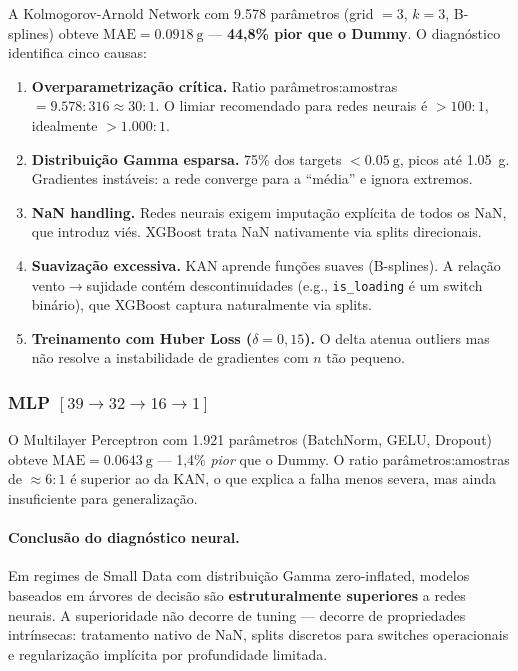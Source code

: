 \documentclass[12pt, a4paper]{article}
\newcommand{\feature}[1]{\texttt{#1}}
\newcommand{\mae}{\text{MAE}}
\begin{document}
A Kolmogorov-Arnold Network com 9.578 parâmetros (grid $= 3$, $k = 3$,
B-splines) obteve $\mae = \SI{0,0918}{\gram}$ --- \textbf{44,8\% pior
que o Dummy}. O diagnóstico identifica cinco causas:

\begin{enumerate}
    \item \textbf{Overparametrização crítica.} Ratio
          parâmetros:amostras $= 9.578:316 \approx 30{:}1$.
          O limiar recomendado para redes neurais é $> 100{:}1$,
          idealmente $> 1.000{:}1$.

    \item \textbf{Distribuição Gamma esparsa.} 75\% dos targets
          $< \SI{0,05}{\gram}$, picos até \SI{1,05}{\gram}. Gradientes
          instáveis: a rede converge para a ``média'' e ignora extremos.

    \item \textbf{NaN handling.} Redes neurais exigem imputação
          explícita de todos os NaN, que introduz viés. XGBoost trata
          NaN nativamente via splits direcionais.

    \item \textbf{Suavização excessiva.} KAN aprende funções suaves
          (B-splines). A relação vento$\to$sujidade contém
          descontinuidades (e.g., \feature{is\_loading} é um switch
          binário), que XGBoost captura naturalmente via splits.

    \item \textbf{Treinamento com Huber Loss ($\delta = 0{,}15$).}
          O delta atenua outliers mas não resolve a instabilidade de
          gradientes com $n$ tão pequeno.
\end{enumerate}

\subsubsection{MLP $[39 \to 32 \to 16 \to 1]$}

O Multilayer Perceptron com 1.921 parâmetros (BatchNorm, GELU,
Dropout) obteve $\mae = \SI{0,0643}{\gram}$ --- 1,4\% \textit{pior}
que o Dummy. O ratio parâmetros:amostras de $\approx 6{:}1$ é
superior ao da KAN, o que explica a falha menos severa, mas ainda
insuficiente para generalização.

\paragraph{Conclusão do diagnóstico neural.} Em regimes de Small Data
com distribuição Gamma zero-inflated, modelos baseados em árvores
de decisão são \textbf{estruturalmente superiores} a redes neurais.
A superioridade não decorre de tuning --- decorre de propriedades
intrínsecas: tratamento nativo de NaN, splits discretos para switches
operacionais e regularização implícita por profundidade limitada.
\end{document}
